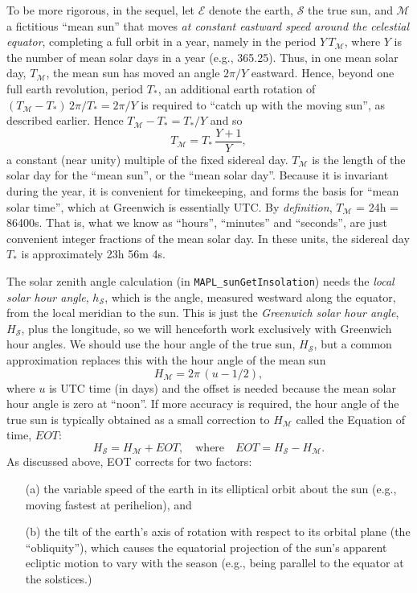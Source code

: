 \documentclass[]{AGUJournal}
\newcommand{\beq}{\begin{equation}}
\newcommand{\eeq}{\end{equation}}
\newcommand{\earth}{{\mathcal{E}}}
\newcommand{\sun}{{\mathcal{S}}}
\newcommand{\mqsun}{{\mathcal{M}}}
\newcommand{\Tsid}{T_*}
\newcommand{\Tmsol}{T_\mqsun}
\begin{document}
To be more rigorous, in the sequel, let $\earth$ denote the earth, $\sun$ the true sun, and $\mqsun$ a fictitious ``mean sun'' that moves 
{\em at constant eastward speed around the celestial equator}, completing a full orbit in a year, namely in the period $Y \,\Tmsol$, where $Y$ 
is the number of mean solar days in a year (e.g., 365.25). Thus, in one mean solar day, $\Tmsol$, the mean sun has moved an angle $2\pi/Y$ 
eastward. Hence, beyond one full earth revolution, period $\Tsid$, an additional earth rotation of $(\Tmsol-\Tsid) \, 2\pi/\Tsid = 2\pi/Y$ is required 
to ``catch up with the moving sun'', as described earlier. Hence $\Tmsol - \Tsid = \Tsid / Y$ and so
\beq
\Tmsol = \Tsid \, \frac{Y+1}{Y},
\label{eq:TMTS}
\eeq
a constant (near unity) multiple of the fixed sidereal day. $\Tmsol$ is the length of the solar day for the ``mean sun'', or the ``mean solar day''. 
Because it is invariant during the year, it is convenient for timekeeping, and forms the basis for ``mean solar time'', which at Greenwich is 
essentially UTC. By {\em definition}, $\Tmsol$ = 24h = 86400s. That is, what we know as ``hours'', ``minutes'' and ``seconds'',  are just 
convenient integer fractions of the mean solar day. In these units, the sidereal day $\Tsid$ is approximately 23h 56m 4s.

The solar zenith angle calculation (in {\tt MAPL\_sunGetInsolation}) needs the {\em local solar hour angle}, $h_\sun$, which is the angle, 
measured westward along the equator, from the local meridian to the sun. This is just the {\em Greenwich solar hour angle}, $H_\sun$, 
plus the longitude, so we will henceforth work exclusively with Greenwich hour angles. We should use the hour angle of the true sun, 
$H_\sun$, but a common approximation replaces this with the hour angle of the mean sun
\beq
H_\mqsun = 2\pi\,(u - 1/2),
\label{eq:HM}
\eeq
where $u$ is UTC time (in days) and the offset is needed because the mean solar hour angle is zero at ``noon''. If more accuracy is 
required, the hour angle of the true sun is typically obtained as a small correction to $H_\mqsun$ called the Equation of time, $EOT$:
\beq
H_\sun = H_\mqsun + EOT,  \quad\text{where}\quad  EOT = H_\sun - H_\mqsun.
\label{eq:EOT-def}
\eeq
As discussed above, EOT corrects for two factors:
\begin{itemize}
\item[(a)]{} the variable speed of the earth in its elliptical orbit about the sun (e.g., moving fastest at perihelion), and
\item[(b)]{} the tilt of the earth's axis of rotation with respect to its orbital plane (the ``obliquity''), which causes the equatorial projection 
of the sun's apparent ecliptic motion to vary with the season (e.g., being parallel to the equator at the solstices.)
\end{itemize}
\end{document}
